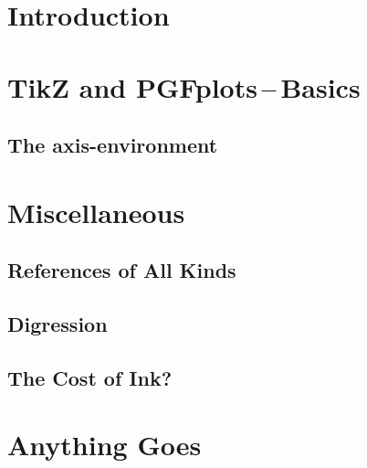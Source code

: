 \documentclass[%
twoside,symmetric,	%
nols, %
a4paper, %
notoc,	%
justified,	%
nobib, %
]{tufte-book} %
\begin{document}
	
	
	
	
	
	\sffamily %
	\tableofcontents
	\normalfont %
	\cleardoublepage
	
	\pagestyle{mystyle}	
	\setcounter{page}{1}
	
	\chapter{Introduction}\label{sec:introduction}
		
		
	\chapter{TikZ and PGFplots\,--\,Basics}
		\section{The axis-environment}
			

	\chapter[Miscellaneous]{Miscellaneous}
		
		\cleardoublepage
		\section[References]{References of All Kinds}
			
			\cleardoublepage
		\section[Fonts]{Digression}
			
			\clearpage
		\section[The Cost of Ink?]{The Cost of Ink?}
			
	\chapter[Anything Goes]{Anything Goes}
		
			
	
	\cleardoublepage %
	
	
	\cleardoublepage
	\printindex
\end{document}
